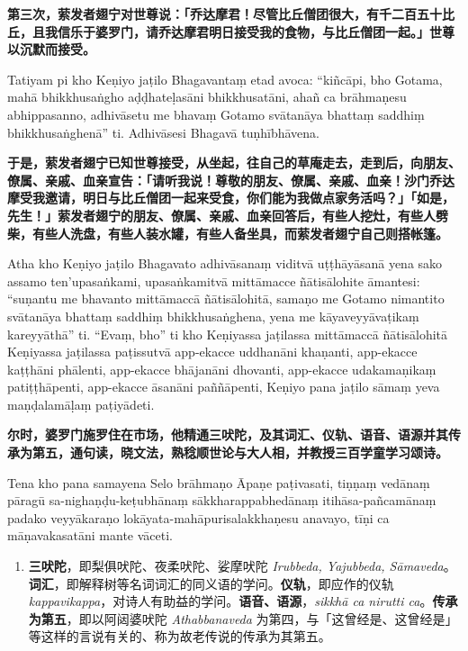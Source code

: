 \textbf{第三次，萦发者翅宁对世尊说：「乔达摩君！尽管比丘僧团很大，有千二百五十比丘，且我信乐于婆罗门，请乔达摩君明日接受我的食物，与比丘僧团一起。」世尊以沉默而接受。}

Tatiyam pi kho Keṇiyo jaṭilo Bhagavantaṃ etad avoca: “kiñcāpi, bho Gotama, mahā bhikkhusaṅgho aḍḍhateḷasāni bhikkhusatāni, ahañ ca brāhmaṇesu abhippasanno, adhivāsetu me bhavaṃ Gotamo svātanāya bhattaṃ saddhiṃ bhikkhusaṅghenā” ti. Adhivāsesi Bhagavā tuṇhībhāvena.

\textbf{于是，萦发者翅宁已知世尊接受，从坐起，往自己的草庵走去，走到后，向朋友、僚属、亲戚、血亲宣告：「请听我说！尊敬的朋友、僚属、亲戚、血亲！沙门乔达摩受我邀请，明日与比丘僧团一起来受食，你们能为我做点家务活吗？」「如是，先生！」萦发者翅宁的朋友、僚属、亲戚、血亲回答后，有些人挖灶，有些人劈柴，有些人洗盘，有些人装水罐，有些人备坐具，而萦发者翅宁自己则搭帐篷。}

Atha kho Keṇiyo jaṭilo Bhagavato adhivāsanaṃ viditvā uṭṭhāyāsanā yena sako assamo ten’upasaṅkami, upasaṅkamitvā mittāmacce ñātisālohite āmantesi: “suṇantu me bhavanto mittāmaccā ñātisālohitā, samaṇo me Gotamo nimantito svātanāya bhattaṃ saddhiṃ bhikkhusaṅghena, yena me kāyaveyyāvaṭikaṃ kareyyāthā” ti. “Evaṃ, bho” ti kho Keṇiyassa jaṭilassa mittāmaccā ñātisālohitā Keṇiyassa jaṭilassa paṭissutvā app-ekacce uddhanāni khaṇanti, app-ekacce kaṭṭhāni phālenti, app-ekacce bhājanāni dhovanti, app-ekacce udakamaṇikaṃ patiṭṭhāpenti, app-ekacce āsanāni paññāpenti, Keṇiyo pana jaṭilo sāmaṃ yeva maṇḍalamāḷaṃ paṭiyādeti.

\textbf{尔时，婆罗门施罗住在市场，他精通三吠陀，及其词汇、仪轨、语音、语源并其传承为第五，通句读，晓文法，熟稔顺世论与大人相，并教授三百学童学习颂诗。}

Tena kho pana samayena Selo brāhmaṇo Āpaṇe paṭivasati, tiṇṇaṃ vedānaṃ pāragū sa-nighaṇḍu-keṭubhānaṃ sākkharappabhedānaṃ itihāsa-pañcamānaṃ padako veyyākaraṇo lokāyata-mahāpurisalakkhaṇesu anavayo, tīṇi ca māṇavakasatāni mante vāceti.

\begin{enumerate}\item \textbf{三吠陀}，即梨俱吠陀、夜柔吠陀、娑摩吠陀 \textit{Irubbeda, Yajubbeda, Sāmaveda}。\textbf{词汇}，即解释树等名词词汇的同义语的学问。\textbf{仪轨}，即应作的仪轨 \textit{kappavikappa}，对诗人有助益的学问。\textbf{语音、语源}，\textit{sikkhā ca nirutti ca}。\textbf{传承为第五}，即以阿闼婆吠陀 \textit{Athabbanaveda} 为第四，与「这曾经是、这曾经是」等这样的言说有关的、称为故老传说的传承为其第五。\end{enumerate}

